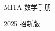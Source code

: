 


\begin{center}
	\vspace*{\fill}
	\vspace{-10mm}
	\titlefontE
	\par\vspace{5mm}\Huge MITA 数学手册
	\par\Large 2025 招新版
	\vspace*{\fill}
\end{center}

\newpage
